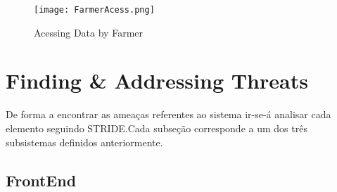 \begin{figure}[h!]

	\centering

 	\texttt{[image: FarmerAcess.png]}

 	\caption {Acessing Data by Farmer}

  	\label{fig03}
\end{figure}


\section{Finding \& Addressing Threats}

	De forma a encontrar as ameaças referentes ao sistema ir-se-á analisar cada elemento seguindo STRIDE.Cada subseção corresponde a um dos três subsistemas definidos anteriormente.



\subsection{FrontEnd}

